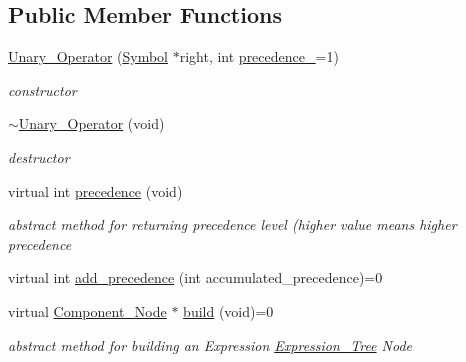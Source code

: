 \subsection*{Public Member Functions}
\begin{DoxyCompactItemize}
\item 
\hyperlink{classMadara_1_1Expression__Tree_1_1Unary__Operator_aad9f3ca19f3a252284732cd01a9dc488}{Unary\_\-Operator} (\hyperlink{classMadara_1_1Expression__Tree_1_1Symbol}{Symbol} $\ast$right, int \hyperlink{classMadara_1_1Expression__Tree_1_1Symbol_a2de31139261eea47dccd48d377780803}{precedence\_\-}=1)
\begin{DoxyCompactList}\small\item\em constructor \item\end{DoxyCompactList}\item 
\hyperlink{classMadara_1_1Expression__Tree_1_1Unary__Operator_a8aec3423c516964c7c8beccf59dffe33}{$\sim$Unary\_\-Operator} (void)
\begin{DoxyCompactList}\small\item\em destructor \item\end{DoxyCompactList}\item 
virtual int \hyperlink{classMadara_1_1Expression__Tree_1_1Symbol_ac060dedb8d16864591b259df375109b3}{precedence} (void)
\begin{DoxyCompactList}\small\item\em abstract method for returning precedence level (higher value means higher precedence \item\end{DoxyCompactList}\item 
virtual int \hyperlink{classMadara_1_1Expression__Tree_1_1Symbol_ae16afabe3c5f9ba32d06386eb02e7e0c}{add\_\-precedence} (int accumulated\_\-precedence)=0
\item 
virtual \hyperlink{classMadara_1_1Expression__Tree_1_1Component__Node}{Component\_\-Node} $\ast$ \hyperlink{classMadara_1_1Expression__Tree_1_1Symbol_a01fdf1d8b06b3d6e49027d35b761cce4}{build} (void)=0
\begin{DoxyCompactList}\small\item\em abstract method for building an Expression \hyperlink{classMadara_1_1Expression__Tree_1_1Expression__Tree}{Expression\_\-Tree} Node \item\end{DoxyCompactList}\end{DoxyCompactItemize}
